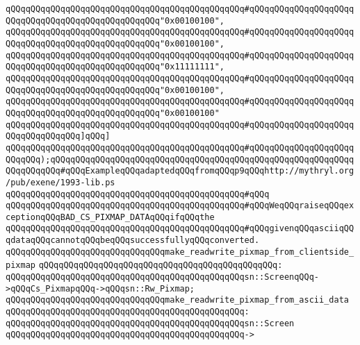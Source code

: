 \verb|qQQqqQQqqQQqqQQqqQQqqQQqqQQqqQQqqQQqqQQqqQQqqQQq#qQQqqQQqqQQqqQQqqQQqqQQqqQQqqQQqqQQqqQQqqQQqqQQqqQQq"0x00100100",|\newline
\verb|qQQqqQQqqQQqqQQqqQQqqQQqqQQqqQQqqQQqqQQqqQQqqQQq#qQQqqQQqqQQqqQQqqQQqqQQqqQQqqQQqqQQqqQQqqQQqqQQqqQQq"0x00100100",|\newline
\verb|qQQqqQQqqQQqqQQqqQQqqQQqqQQqqQQqqQQqqQQqqQQqqQQq#qQQqqQQqqQQqqQQqqQQqqQQqqQQqqQQqqQQqqQQqqQQqqQQqqQQq"0x11111111",|\newline
\verb|qQQqqQQqqQQqqQQqqQQqqQQqqQQqqQQqqQQqqQQqqQQqqQQq#qQQqqQQqqQQqqQQqqQQqqQQqqQQqqQQqqQQqqQQqqQQqqQQqqQQq"0x00100100",|\newline
\verb|qQQqqQQqqQQqqQQqqQQqqQQqqQQqqQQqqQQqqQQqqQQqqQQq#qQQqqQQqqQQqqQQqqQQqqQQqqQQqqQQqqQQqqQQqqQQqqQQqqQQq"0x00100100"|\newline
\verb|qQQqqQQqqQQqqQQqqQQqqQQqqQQqqQQqqQQqqQQqqQQqqQQq#qQQqqQQqqQQqqQQqqQQqqQQqqQQqqQQqqQQq]qQQq]|\newline
\verb|qQQqqQQqqQQqqQQqqQQqqQQqqQQqqQQqqQQqqQQqqQQqqQQq#qQQqqQQqqQQqqQQqqQQqqQQqqQQq);qQQqqQQqqQQqqQQqqQQqqQQqqQQqqQQqqQQqqQQqqQQqqQQqqQQqqQQqqQQqqQQqqQQqqQQq#qQQqExampleqQQqadaptedqQQqfromqQQqp9qQQqhttp://mythryl.org/pub/exene/1993-lib.ps|\newline
\verb|qQQqqQQqqQQqqQQqqQQqqQQqqQQqqQQqqQQqqQQqqQQqqQQq#qQQq|\newline
\verb|qQQqqQQqqQQqqQQqqQQqqQQqqQQqqQQqqQQqqQQqqQQqqQQq#qQQqWeqQQqraiseqQQqexceptionqQQqBAD_CS_PIXMAP_DATAqQQqifqQQqthe|\newline
\verb|qQQqqQQqqQQqqQQqqQQqqQQqqQQqqQQqqQQqqQQqqQQqqQQq#qQQqgivenqQQqasciiqQQqdataqQQqcannotqQQqbeqQQqsuccessfullyqQQqconverted.|\newline
\newline
\verb|qQQqqQQqqQQqqQQqqQQqqQQqqQQqqQQqmake_readwrite_pixmap_from_clientside_pixmap|\newline
\verb|qQQqqQQqqQQqqQQqqQQqqQQqqQQqqQQqqQQqqQQqqQQqqQQq:|\newline
\verb|qQQqqQQqqQQqqQQqqQQqqQQqqQQqqQQqqQQqqQQqqQQqqQQqsn::ScreenqQQq->qQQqCs_PixmapqQQq->qQQqsn::Rw_Pixmap;|\newline
\newline
\verb|qQQqqQQqqQQqqQQqqQQqqQQqqQQqqQQqmake_readwrite_pixmap_from_ascii_data|\newline
\verb|qQQqqQQqqQQqqQQqqQQqqQQqqQQqqQQqqQQqqQQqqQQqqQQq:|\newline
\verb|qQQqqQQqqQQqqQQqqQQqqQQqqQQqqQQqqQQqqQQqqQQqqQQqsn::Screen|\newline
\verb|qQQqqQQqqQQqqQQqqQQqqQQqqQQqqQQqqQQqqQQqqQQqqQQq->|\newline
